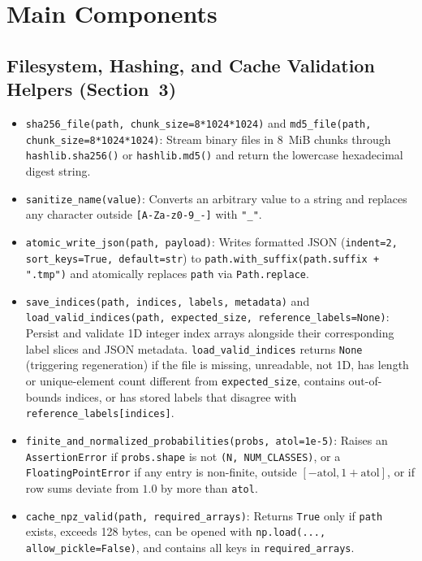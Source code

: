 \documentclass[11pt,a4paper]{article}
\begin{document}
\section{Main Components}
\label{sec:components}

\subsection{Filesystem, Hashing, and Cache Validation Helpers (Section~3)}
\begin{itemize}
  \item \texttt{sha256\_\allowbreak{}file(path, chunk\_\allowbreak{}size=8*1024*1024)} and \texttt{md5\_\allowbreak{}file(path, chunk\_\allowbreak{}size=8*1024*1024)}: Stream binary files in 8~MiB chunks through \texttt{hashlib.sha256()} or \texttt{hashlib.md5()} and return the lowercase hexadecimal digest string.
  \item \texttt{sanitize\_\allowbreak{}name(value)}: Converts an arbitrary value to a string and replaces any character outside \texttt{[A-Za-z0-9\_\allowbreak{}-]} with \texttt{"\_\allowbreak{}"}.
  \item \texttt{atomic\_\allowbreak{}write\_\allowbreak{}json(path, payload)}: Writes formatted JSON (\texttt{indent=2, sort\_\allowbreak{}keys=True, default=str}) to \texttt{path.with\_\allowbreak{}suffix(path.suffix + ".tmp")} and atomically replaces \texttt{path} via \texttt{Path.replace}.
  \item \texttt{save\_\allowbreak{}indices(path, indices, labels, metadata)} and \texttt{load\_\allowbreak{}valid\_\allowbreak{}indices(path, expected\_\allowbreak{}size, reference\_\allowbreak{}labels=None)}: Persist and validate 1D integer index arrays alongside their corresponding label slices and JSON metadata. \texttt{load\_\allowbreak{}valid\_\allowbreak{}indices} returns \texttt{None} (triggering regeneration) if the file is missing, unreadable, not 1D, has length or unique-element count different from \texttt{expected\_\allowbreak{}size}, contains out-of-bounds indices, or has stored labels that disagree with \texttt{reference\_\allowbreak{}labels[indices]}.
  \item \texttt{finite\_\allowbreak{}and\_\allowbreak{}normalized\_\allowbreak{}probabilities(probs, atol=1e-5)}: Raises an \texttt{AssertionError} if \texttt{probs.shape} is not \texttt{(N, NUM\_\allowbreak{}CLASSES)}, or a \texttt{FloatingPointError} if any entry is non-finite, outside $[-\text{atol}, 1+\text{atol}]$, or if row sums deviate from $1.0$ by more than \texttt{atol}.
  \item \texttt{cache\_\allowbreak{}npz\_\allowbreak{}valid(path, required\_\allowbreak{}arrays)}: Returns \texttt{True} only if \texttt{path} exists, exceeds 128 bytes, can be opened with \texttt{np.load(..., allow\_\allowbreak{}pickle=False)}, and contains all keys in \texttt{required\_\allowbreak{}arrays}.
\end{itemize}
\end{document}
